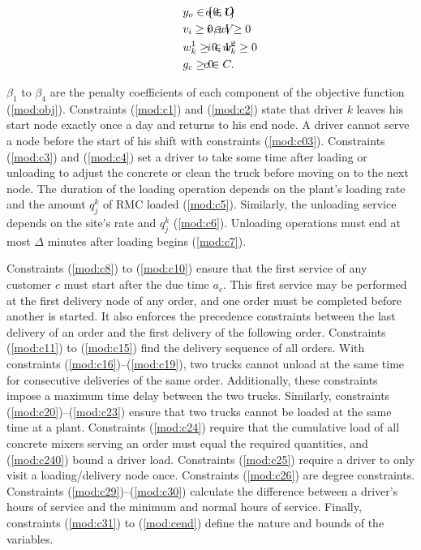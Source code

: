 \documentclass{article}
\begin{document}
{\begin{alignat}{3}
    \label{mod:c36}        & y_o \in \{0,1\}     & \hspace{-20mm}  o \in O            \text{ }                     \\
    \label{mod:c37}        & v_i \geq 0,  w_i \geq 0     & \hspace{-20mm}  i \in V         \text{ }                \\
    \label{mod:c38}        & w^1_{k} \geq 0,  w^2_k \geq 0  & \hspace{-20mm}  i \in V         \text{ }        \\
    \label{mod:cend}       & g_c \geq 0    & \hspace{-20mm}  c \in C.  \text{ }
\end{alignat}
}

$\beta_1$ to $\beta_4$ are the penalty coefficients of each component of the objective function (\ref{mod:obj}). Constraints (\ref{mod:c1}) and (\ref{mod:c2}) state that driver $k$ leaves his start node exactly once a day and returns to his end node. A driver cannot serve a node before the start of his shift with constraints (\ref{mod:c03}). Constraints (\ref{mod:c3}) and (\ref{mod:c4}) set a driver to take some time after loading or unloading to adjust the concrete or clean the truck before moving on to the next node. The duration of the loading operation depends on the plant's loading rate and the amount $q^k_j$ of RMC loaded (\ref{mod:c5}). Similarly, the unloading service depends on the site's rate and $q^k_j$ (\ref{mod:c6}). Unloading operations must end at most $\Delta$ minutes after loading begins (\ref{mod:c7}).

Constraints (\ref{mod:c8}) to (\ref{mod:c10}) ensure that the first service of any customer $c$ must start after the due time $a_c$. This first service may be performed at the first delivery node of any order, and one order must be completed before another is started. It also enforces the precedence constraints between the last delivery of an order and the first delivery of the following order. Constraints (\ref{mod:c11}) to (\ref{mod:c15}) find the delivery sequence of all orders. With constraints (\ref{mod:c16})--(\ref{mod:c19}), two trucks cannot unload at the same time for consecutive deliveries of the same order. Additionally, these constraints impose a maximum time delay between the two trucks. Similarly, constraints (\ref{mod:c20})--(\ref{mod:c23}) ensure that two trucks cannot be loaded at the same time at a plant. Constraints (\ref{mod:c24}) require that the cumulative load of all concrete mixers serving an order must equal the required quantities, and (\ref{mod:c240}) bound a driver load. Constraints (\ref{mod:c25}) require a driver to only visit a loading/delivery node once. Constraints (\ref{mod:c26}) are degree constraints. Constraints (\ref{mod:c29})--(\ref{mod:c30}) calculate the difference between a driver's hours of service and the minimum and normal hours of service. Finally, constraints (\ref{mod:c31}) to (\ref{mod:cend}) define the nature and bounds of the variables.
\end{document}
